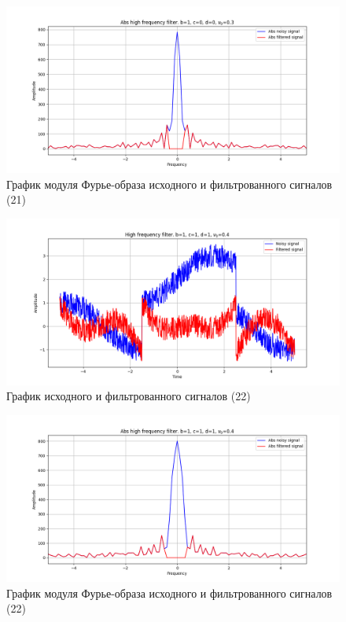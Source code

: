 \documentclass[a4paper, 12pt]{article}
\begin{document}
    \begin{figure}[!htb]
        \centering
        \includegraphics[scale=0.48]{21_abs_u_U_nolow.png}
        \captionsetup{skip=0pt}
        \caption{График модуля Фурье-образа исходного и фильтрованного сигналов (21)}
        \label{fig:fig68}
    \end{figure}
    \begin{figure}[!htb]
        \centering
        \includegraphics[scale=0.48]{22_u_flt_u_nolow.png}
        \captionsetup{skip=0pt}
        \caption{График исходного и фильтрованного сигналов (22)}
        \label{fig:fig_a}
    \end{figure}
    \begin{figure}[!htb]
        \centering
        \includegraphics[scale=0.48]{22_abs_u_U_nolow.png}
        \captionsetup{skip=0pt}
        \caption{График модуля Фурье-образа исходного и фильтрованного сигналов (22)}
        \label{fig:fig_b}
    \end{figure}
\end{document}
